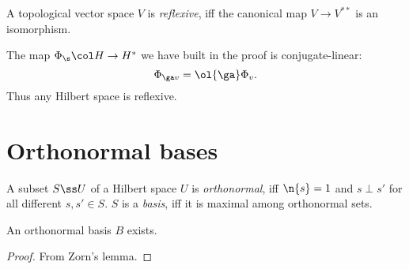 \begin{definition}
  A topological vector space $V$ is \emph{reflexive}, iff the canonical map $V \to V^{**}$ is an isomorphism.
\end{definition}

\begin{example}
  The map $\Phi_\s \col H \to H^*$ we have built in the proof is conjugate-linear:
  $$ \Phi_{\ga v} = \ol{\ga} \Phi_v. $$
  Thus any Hilbert space is reflexive.
\end{example}

\section{Orthonormal bases}

\begin{definition}
  A subset $S \ss U$ of a Hilbert space $U$ is \emph{orthonormal}, iff $\n{s} = 1$ and $s \perp s'$ for all different $s, s' \in S$. $S$ is a \emph{basis}, iff it is maximal among orthonormal sets.
\end{definition}

\begin{lemma}
  An orthonormal basis $B$ exists.
\end{lemma}

\begin{proof}
  From Zorn's lemma.
\end{proof}